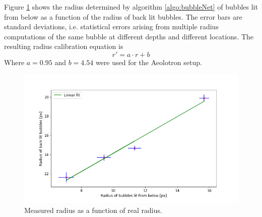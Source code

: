 			Figure \ref{fig:radius_calib_result} shows the radius determined by algorithm \ref{algo:bubbleNet} of bubbles lit from below as a function of the radius of back lit bubbles. The error bars are standard deviations, i.e. statistical errors arising from multiple radius computations of the same bubble at different depths and different locations. The resulting radius calibration equation is 
			\begin{equation}
				r' = a \cdot r + b
				\label{eq:radius_calib}
			\end{equation}
			Where $a= 0.95$ and $b=4.54$ were used for the Aeolotron setup. 
			
			\begin{figure}
				\centering
				\includegraphics[scale=.6]{graphs/radius_calibration_result.png}
				\caption{Measured radius as a function of real radius.}
				\label{fig:radius_calib_result}
			\end{figure}
			
			
			
			
			
































